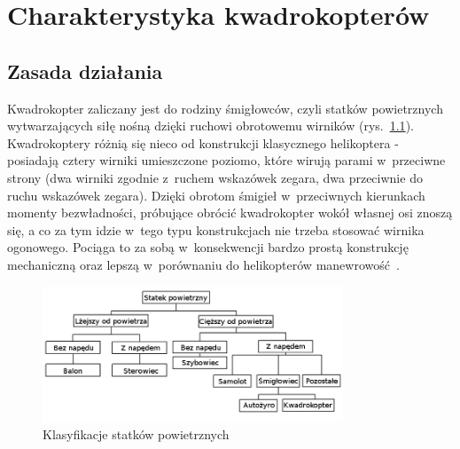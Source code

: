 
\chapter{Charakterystyka kwadrokopterów} %

\label{Chapter2} %



\section{Zasada działania}
Kwadrokopter zaliczany jest do rodziny śmigłowców, czyli statków powietrznych wytwarzających siłę nośną dzięki ruchowi obrotowemu wirników (rys.~\ref{fig:quadrotor_clasification.png}). Kwadrokoptery różnią się nieco od konstrukcji klasycznego helikoptera - posiadają cztery wirniki umieszczone poziomo, które wirują parami w~przeciwne strony (dwa wirniki zgodnie z~ruchem wskazówek zegara, dwa przeciwnie do ruchu wskazówek zegara). Dzięki obrotom śmigieł w~przeciwnych kierunkach momenty bezwładności, próbujące obrócić kwadrokopter wokół własnej osi znoszą się, a co za tym idzie w~tego typu konstrukcjach nie trzeba stosować wirnika ogonowego. Pociąga to za sobą w~konsekwencji bardzo prostą konstrukcję mechaniczną oraz lepszą w~porównaniu do helikopterów manewrowość~\cite{quadro1}. 

\begin{figure}[htbp]
	\centering
		\includegraphics[width=0.8\textwidth]{Pictures/quadrotor_clasification2.png}
		\caption[Klasyfikacja statków powietrznych]{Klasyfikacje statków powietrznych~\cite{quadro2, quadro3}}
		\label{fig:quadrotor_clasification.png}
\end{figure}

